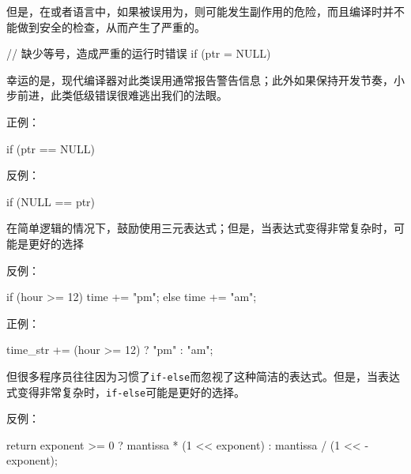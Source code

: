 \begin{content}
但是，在\clang{}或者\cpp{}语言中，如果\ascii{==}被误用为\ascii{=}，则可能发生副作用的危险，而且编译时并不能做到安全的检查，从而产生了严重的。

\begin{leftbar}
\begin{c++}
// 缺少等号，造成严重的运行时错误
if (ptr = NULL)
\end{c++}
\end{leftbar}

幸运的是，现代编译器对此类误用通常报告警告信息；此外如果保持开发节奏，小步前进，此类低级错误很难逃出我们的法眼。

正例：
\begin{leftbar}
\begin{c++}
if (ptr == NULL)
\end{c++}
\end{leftbar}

反例：
\begin{leftbar}
\begin{c++}
if (NULL == ptr)
\end{c++}
\end{leftbar}


\begin{regulation}
在简单逻辑的情况下，鼓励使用三元表达式；但是，当表达式变得非常复杂时，可能是更好的选择
\end{regulation}

反例：
\begin{leftbar}
\begin{c++}
if (hour >= 12) 
{
    time += "pm";
} 
else 
{
    time += "am";
}
\end{c++}
\end{leftbar}

正例：
\begin{leftbar}
\begin{c++}
time_str += (hour >= 12) ? "pm" : "am";
\end{c++}
\end{leftbar}

但很多程序员往往因为习惯了\texttt{if-else}而忽视了这种简洁的表达式。但是，当表达式变得非常复杂时，\texttt{if-else}可能是更好的选择。

反例：
\begin{leftbar}
\begin{c++}
return exponent >= 0 ? mantissa * (1 << exponent) : mantissa / (1 << -exponent);
\end{c++}
\end{leftbar}


\end{content}
